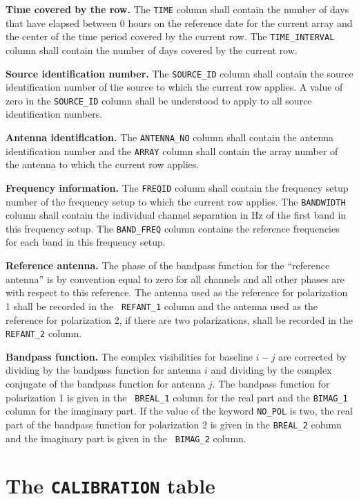 \documentclass[twoside]{article}
\begin{document}
{\bf Time covered by the row.}  The {\tt TIME} column shall contain
the number of days that have elapsed between 0 hours on the reference
date for the current array and the center of the time period covered
by the current row. The {\tt TIME\_INTERVAL} column shall contain the
number of days covered by the current row.

{\bf Source identification number.}  The {\tt SOURCE\_ID} column shall
contain the source identification number of the source to which the
current row applies.  A value of zero in the {\tt SOURCE\_ID} column
shall be understood to apply to all source identification numbers.

{\bf Antenna identification.}  The {\tt ANTENNA\_NO} column shall
contain the antenna identification number and the {\tt ARRAY} column
shall contain the array number of the antenna to which the current row
applies.

{\bf Frequency information.}  The {\tt FREQID} column shall contain
the frequency setup number of the frequency setup to which the current
row applies.  The {\tt BANDWIDTH} column shall contain the individual
channel separation in Hz of the first band in this frequency setup.
The {\tt BAND\_FREQ} column contains the reference frequencies for
each band in this frequency setup.

{\bf Reference antenna.}  The phase of the bandpass function for the
``reference antenna'' is by convention equal to zero for all channels
and all other phases are with respect to this reference.  The antenna
used as the reference for polarization 1 shall be recorded in the {\tt
REFANT\_1} column and the antenna used as the reference for
polarization 2, if there are two polarizations, shall be recorded in
the {\tt REFANT\_2} column.

{\bf Bandpass function.}  The complex visibilities for baseline $i-j$
are corrected by dividing by the bandpass function for antenna $i$ and
dividing by the complex conjugate of the bandpass function for antenna
$j$.  The bandpass function for polarization 1 is given in the {\tt
  BREAL\_1} column for the real part and the {\tt BIMAG\_1} column for
the imaginary part.  If the value of the keyword {\tt NO\_POL} is two,
the real part of the bandpass function for polarization 2 is given in
the {\tt BREAL\_2} column and the imaginary part is given in the {\tt
  BIMAG\_2} column.

\section{The {\tt CALIBRATION} table}
\label{s:CA}
\end{document}
